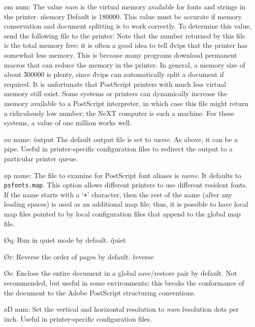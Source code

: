 {\o m num:  The value {\it num} is the virtual memory available for fonts
and strings in the printer.
\^{memory}
Default is 180000.  This value must be accurate if memory conservation and
document splitting is to work correctly.  To determine this value, send the
following file to the printer:
{\parindent=40pt}
\noindent
Note that the number returned by this file is the total memory free;
it is often a good idea to tell \.{dvips} that the printer has somewhat
less memory.  This is because many programs download permanent macros
that can reduce the memory in the printer.  In general, a memory size
of about \.{300000} is plenty, since \.{dvips} can automatically split
a document if required.  It is unfortunate that PostScript printers with
much less virtual memory still exist.
Some systems or printers can dynamically increase the memory available
to a PostScript interpreter, in which case this file might return a
ridiculously low number; the NeXT computer is such a machine.  For these
systems, a value of one million works well.

\o o name:
\^{output}
The default output file is set to {\it name}.  As above, it can be a pipe.
Useful in printer-specific configuration files to redirect the output to
a particular printer queue.

\o p name:
The file to examine for PostScript font aliases is {\it name}.  It
defaults to {\tt psfonts.map}.  This option allows different printers
to use different resident fonts.  If the name starts with a `{\tt +}'
character, then the rest of the name (after any leading spaces) is used
as an additional map file; thus, it is possible to have local map files
pointed to by local configuration files that append to the global
map file.

\O q:  Run in quiet mode by default.
\^{quiet}

\O r:  Reverse the order of pages by default.
\^{reverse}

\O s:
Enclose the entire document in a global save/restore pair by default.
Not recommended, but useful in some environments; this breaks the
conformance of the document to the Adobe PostScript structuring
conventions.

\o D num:
Set the vertical and horizontal resolution to {\it num}
\^{resolution}
dots per inch.  Useful in printer-specific configuration files.

}
